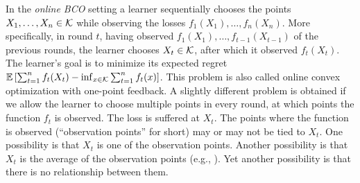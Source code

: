 In the \emph{online BCO} setting a learner sequentially chooses the points $X_1,\dots,X_n\in \mathcal{K}$ while observing the losses $f_1(X_1),\dots,f_n(X_n)$. More specifically, in round $t$, having observed $f_1(X_1),\dots,f_{t-1}(X_{t-1})$ of the previous rounds, the learner chooses $X_t\in \mathcal{K}$, after which it observed $f_t(X_t)$. The learner's goal is to minimize its expected regret $\mathbb{E}\left[ \sum_{t=1}^n f_t(X_t) - \inf_{x\in \mathcal{K}} \sum_{t=1}^n f_t(x) \right]$. 
This problem is also called online convex optimization with one-point feedback.
A slightly different problem is obtained if we allow the learner to choose multiple points in every round, at which points the function $f_t$ is observed. The loss is suffered at $X_t$. The points where the function is observed (``observation points'' for short) may or may not be tied to $X_t$. One possibility is that $X_t$ is one of the observation points.  
Another possibility is that $X_t$ is the average of the observation points (e.g., \citealt{AgDeXi10}). Yet another possibility is that there is no relationship between them. 

